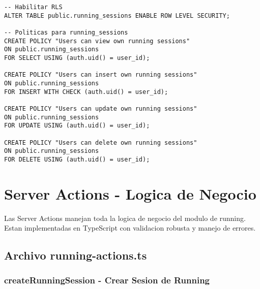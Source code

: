 \documentclass[12pt,a4paper]{article}
\begin{document}
\begin{lstlisting}[style=sqlstyle, caption=Politicas RLS para running_sessions]
-- Habilitar RLS
ALTER TABLE public.running_sessions ENABLE ROW LEVEL SECURITY;

-- Politicas para running_sessions
CREATE POLICY "Users can view own running sessions" 
ON public.running_sessions
FOR SELECT USING (auth.uid() = user_id);

CREATE POLICY "Users can insert own running sessions" 
ON public.running_sessions
FOR INSERT WITH CHECK (auth.uid() = user_id);

CREATE POLICY "Users can update own running sessions" 
ON public.running_sessions
FOR UPDATE USING (auth.uid() = user_id);

CREATE POLICY "Users can delete own running sessions" 
ON public.running_sessions
FOR DELETE USING (auth.uid() = user_id);
\end{lstlisting}

\section{Server Actions - Logica de Negocio}

Las Server Actions manejan toda la logica de negocio del modulo de running. Estan implementadas en TypeScript con validacion robusta y manejo de errores.

\subsection{Archivo running-actions.ts}

\subsubsection{createRunningSession - Crear Sesion de Running}
\end{document}
